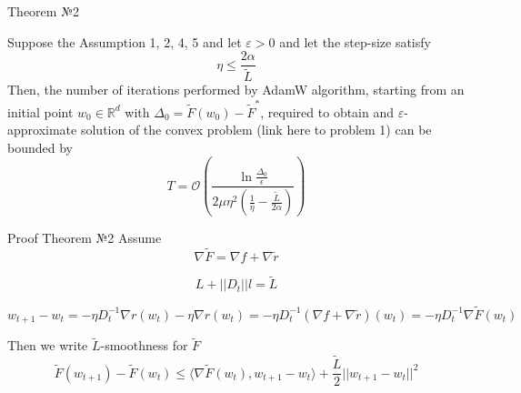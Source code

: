 \documentclass[aspectratio=169, 12pt]{beamer}
\begin{document}
\begin{frame}{Theorem №2}
    \begin{theorem}
    Suppose the Assumption 1, 2, 4, 5 and let $\varepsilon > 0$ and let the step-size satisfy
    \begin{equation*}
        \eta \leq \frac{2 \alpha}{\tilde{L}}
    \end{equation*}
    Then, the number of iterations performed by AdamW algorithm, starting from an initial point $w_0 \in \mathbb{R}^d$ with $\Delta_0 = \tilde{F}(w_0) - \tilde{F}^*$, required to obtain and $\varepsilon$-approximate solution of the convex problem (link here to problem 1) can be bounded by
    \begin{equation*}
        T =  \mathcal{O}\left( \frac{\ln \frac{\Delta_0}{\epsilon}}{2 \mu \eta^2(\frac{1}{\eta} - \frac{\tilde{L}}{2 \alpha})} \right)
    \end{equation*}
\end{theorem}
\end{frame}

\begin{frame}{Proof Theorem №2}
        Assume 
    \begin{equation*}
    \nabla \tilde{F} = \nabla f + \nabla \tilde{r}    
    \end{equation*}
    
    \begin{equation*}
    L + ||D_t||l = \tilde{L}        
    \end{equation*}
    
    \begin{equation*}
    w_{t+1} - w_t = -\eta D_t^{-1} \nabla r(w_t) - \eta \nabla r(w_t) = -\eta D_t^{-1} (\nabla f + \nabla \tilde{r})(w_t) = -\eta D_t^{-1} \nabla \tilde{F}(w_t)    
    \end{equation*}
    
    Then we write $\tilde{L}$-smoothness for $\tilde{F}$ 
    \begin{equation*}
        \tilde{F}(w_{t+1}) - \tilde{F}(w_t) \leq  \langle \nabla \tilde{F}(w_t), w_{t+1} - w_t \rangle + \frac{\tilde{L}}{2} ||w_{t+1} - w_t||^2
    \end{equation*}

    
\end{frame}
\end{document}
